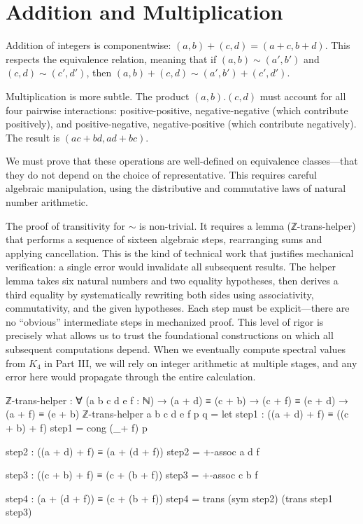 \documentclass[11pt,a4paper]{book}
\def\cdot{.}%
\def\texttt#1{#1}%
\begin{document}
\section{Addition and Multiplication}

Addition of integers is componentwise: $(a,b) + (c,d) = (a+c, b+d)$. This respects 
the equivalence relation, meaning that if $(a,b) \sim (a',b')$ and $(c,d) \sim (c',d')$, 
then $(a,b) + (c,d) \sim (a',b') + (c',d')$.

Multiplication is more subtle. The product $(a,b) \cdot (c,d)$ must account for all 
four pairwise interactions: positive-positive, negative-negative (which contribute 
positively), and positive-negative, negative-positive (which contribute negatively). 
The result is $(ac + bd, ad + bc)$.

We must prove that these operations are well-defined on equivalence classes—that they 
do not depend on the choice of representative. This requires careful algebraic manipulation, 
using the distributive and commutative laws of natural number arithmetic.

The proof of transitivity for $\sim$ is non-trivial. It requires a lemma (\texttt{ℤ-trans-helper}) 
that performs a sequence of sixteen algebraic steps, rearranging sums and applying 
cancellation. This is the kind of technical work that justifies mechanical verification: 
a single error would invalidate all subsequent results. The helper lemma takes six natural 
numbers and two equality hypotheses, then derives a third equality by systematically 
rewriting both sides using associativity, commutativity, and the given hypotheses. Each 
step must be explicit—there are no ``obvious'' intermediate steps in mechanized proof. 
This level of rigor is precisely what allows us to trust the foundational constructions 
on which all subsequent computations depend. When we eventually compute spectral values 
from $K_4$ in Part III, we will rely on integer arithmetic at multiple stages, and any 
error here would propagate through the entire calculation.

\begin{code}
ℤ-trans-helper : ∀ (a b c d e f : ℕ)
               → (a + d) ≡ (c + b)
               → (c + f) ≡ (e + d)
               → (a + f) ≡ (e + b)
ℤ-trans-helper a b c d e f p q =
  let
    step1 : ((a + d) + f) ≡ ((c + b) + f)
    step1 = cong (_+ f) p
    
    step2 : ((a + d) + f) ≡ (a + (d + f))
    step2 = +-assoc a d f
    
    step3 : ((c + b) + f) ≡ (c + (b + f))
    step3 = +-assoc c b f
    
    step4 : (a + (d + f)) ≡ (c + (b + f))
    step4 = trans (sym step2) (trans step1 step3)
    
\end{code}
\end{document}
